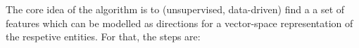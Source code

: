 





The core idea of the algorithm is to (unsupervised, data-driven) find a a set of features which can be modelled as directions for a vector-space representation of the respetive entities. For that, the steps are:

